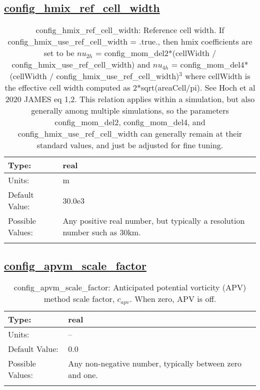 \subsection[config\_hmix\_ref\_cell\_width]{\hyperref[sec:nm_tab_hmix]{config\_hmix\_ref\_cell\_width}}
\label{subsec:nm_sec_config_hmix_ref_cell_width}
\begin{center}
\begin{longtable}{| p{2.0in} || p{4.0in} |}
    \hline
    Type: & real \\
    \hline
    Units: & \si{m} \\
    \hline
    Default Value: & 30.0e3 \\
    \hline
    Possible Values: & Any positive real number, but typically a resolution number such as 30km. \\
    \hline
    \caption{config\_hmix\_ref\_cell\_width: Reference cell width. If config\_hmix\_use\_ref\_cell\_width = .true., then hmix coefficients are set to be $nu_{2h}$ = config\_mom\_del2*(cellWidth / config\_hmix\_use\_ref\_cell\_width) and $nu_{4h}$ = config\_mom\_del4*(cellWidth / config\_hmix\_use\_ref\_cell\_width)$^3$ where cellWidth is the effective cell width computed as 2*sqrt(areaCell/pi). See Hoch et al 2020 JAMES eq 1,2. This relation applies within a simulation, but also generally among multiple simulations, so the parameters config\_mom\_del2, config\_mom\_del4, and config\_hmix\_use\_ref\_cell\_width can generally remain at their standard values, and just be adjusted for fine tuning.}
\end{longtable}
\end{center}
\subsection[config\_apvm\_scale\_factor]{\hyperref[sec:nm_tab_hmix]{config\_apvm\_scale\_factor}}
\label{subsec:nm_sec_config_apvm_scale_factor}
\begin{center}
\begin{longtable}{| p{2.0in} || p{4.0in} |}
    \hline
    Type: & real \\
    \hline
    Units: & -- \\
    \hline
    Default Value: & 0.0 \\
    \hline
    Possible Values: & Any non-negative number, typically between zero and one. \\
    \hline
    \caption{config\_apvm\_scale\_factor: Anticipated potential vorticity (APV) method scale factor, $c_{apv}$. When zero, APV is off.}
\end{longtable}
\end{center}
